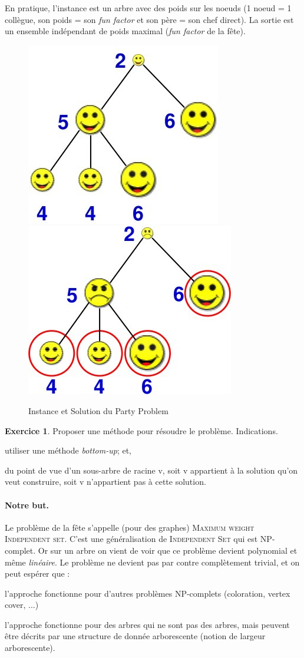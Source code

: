 \documentclass[a4paper,12pt]{article}
\theoremstyle{definition}
\newtheorem{exo}{Exercice}%
\theoremstyle{remark}
\begin{document}
En pratique, l'instance est un arbre avec des poids sur les noeuds (1 noeud = 1
collègue, son poids = son \textsl{fun factor} et son père = son chef direct).
La sortie est un ensemble indépendant de poids maximal (\textsl{fun factor} de
la fête).

\begin{figure}[h]
  \centering
  \begin{center}
    \includegraphics[width=.35\textwidth]{dessins/PartyProblemInput.jpg}
    \quad \quad
    \includegraphics[width=.35\textwidth]{dessins/PartyProblemSolution.jpg}
  \end{center}
  \caption{Instance et Solution du Party Problem}
\end{figure}

\begin{exo}
  Proposer une méthode pour résoudre le problème. Indications.
  \begin{compactitem}
  \item  utiliser une méthode \textsl{bottom-up}; et,
  \item du point de vue d'un sous-arbre de racine v, soit v appartient à la solution
  qu'on veut construire,
  soit v n'appartient pas à cette solution.
  \end{compactitem}
\end{exo}

\paragraph{Notre but.} Le problème de la fête s'appelle (pour des
graphes) \textsc{Maximum weight Independent set}. C'est une généralisation
de \textsc{Independent Set} qui est NP-complet. Or sur un arbre on
vient de voir que ce problème devient polynomial et même \emph{linéaire}. 
Le problème ne devient pas par contre complètement trivial, et on peut
espérer que :
\begin{compactitem}
\item l'approche fonctionne pour d'autres problèmes NP-complets (coloration,
  vertex cover, ...)
\item l'approche fonctionne pour des arbres qui ne sont pas des
  arbres, mais peuvent être décrits par une structure de donnée
  arborescente (notion de largeur arborescente). 
\end{compactitem}
\end{document}

